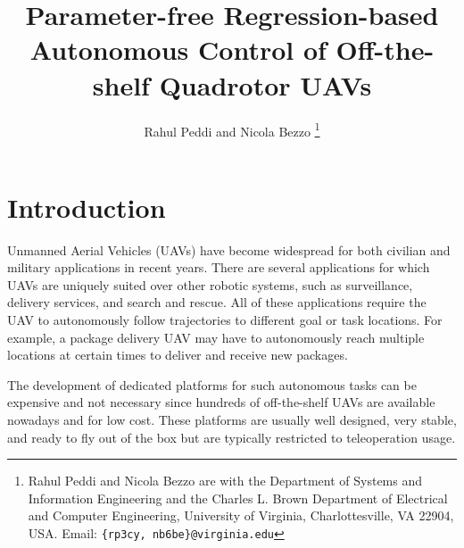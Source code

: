 \documentclass[letterpaper, 10 pt, conference]{ieeeconf}  %
\newcommand\NB[1]{$\spadesuit$\footnote{NB: #1}}
\begin{document}
\title{\LARGE \bf
Parameter-free Regression-based Autonomous Control of Off-the-shelf Quadrotor UAVs
}


\author{Rahul Peddi and Nicola Bezzo%
\thanks{Rahul Peddi and Nicola Bezzo are with the Department of Systems and Information Engineering and the Charles L. Brown Department of Electrical and Computer Engineering, University of Virginia, Charlottesville, VA 22904, USA. Email: {\tt \{rp3cy, nb6be\}@virginia.edu}}}



\maketitle
\thispagestyle{empty}
\pagestyle{empty}


\begin{abstract}


\end{abstract}


\section{Introduction}
Unmanned Aerial Vehicles (UAVs) have become widespread for both civilian and military applications in recent years. There are several applications for which UAVs are uniquely suited over other robotic systems, such as surveillance, delivery services, and search and rescue. All of these applications require the UAV to autonomously follow trajectories to different goal or task locations. For example, a package delivery UAV may have to autonomously reach multiple locations at certain times to deliver and receive new packages. 

The development of dedicated platforms for such autonomous tasks can be expensive and not necessary since hundreds of off-the-shelf UAVs are available nowadays and for low cost. These platforms are usually well designed, very stable, and ready to fly out of the box but are typically restricted to teleoperation usage.
\end{document}
